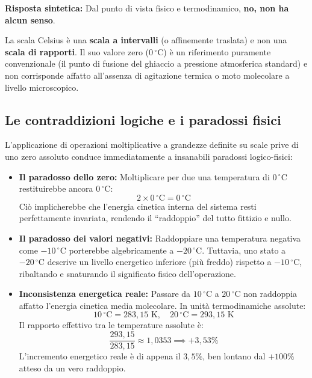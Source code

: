 \documentclass[11pt,a4paper,oneside]{report}
\begin{document}
\begin{approfondimento}
\textbf{Risposta sintetica:} Dal punto di vista fisico e termodinamico, \textbf{no, non ha alcun senso}.

La scala Celsius \`e una \textbf{scala a intervalli} (o affinemente traslata) e non una \textbf{scala di rapporti}. Il suo valore zero ($0\,{^\circ}\text{C}$) \`e un riferimento puramente convenzionale (il punto di fusione del ghiaccio a pressione atmosferica standard) e non corrisponde affatto all'assenza di agitazione termica o moto molecolare a livello microscopico.

\subsection*{Le contraddizioni logiche e i paradossi fisici}
L'applicazione di operazioni moltiplicative a grandezze definite su scale prive di uno zero assoluto conduce immediatamente a insanabili paradossi logico-fisici:
\begin{itemize}[leftmargin=*, nosep]
  \item \textbf{Il paradosso dello zero:} Moltiplicare per due una temperatura di $0\,{^\circ}\text{C}$ restituirebbe ancora $0\,{^\circ}\text{C}$:
  \[
  2 \times 0\,{^\circ}\text{C} = 0\,{^\circ}\text{C}
  \]
  Ci\`o implicherebbe che l'energia cinetica interna del sistema resti perfettamente invariata, rendendo il ``raddoppio'' del tutto fittizio e nullo.
  \item \textbf{Il paradosso dei valori negativi:} Raddoppiare una temperatura negativa come $-10\,{^\circ}\text{C}$ porterebbe algebricamente a $-20\,{^\circ}\text{C}$. Tuttavia, uno stato a $-20\,{^\circ}\text{C}$ descrive un livello energetico inferiore (pi\`u freddo) rispetto a $-10\,{^\circ}\text{C}$, ribaltando e snaturando il significato fisico dell'operazione.
  \item \textbf{Inconsistenza energetica reale:} Passare da $10\,{^\circ}\text{C}$ a $20\,{^\circ}\text{C}$ non raddoppia affatto l'energia cinetica media molecolare. In unit\`a termodinamiche assolute:
  \[
  10\,{^\circ}\text{C} = 283{,}15\text{ K}, \quad 20\,{^\circ}\text{C} = 293{,}15\text{ K}
  \]
  Il rapporto effettivo tra le temperature assolute \`e:
  \[
  \frac{293{,}15}{283{,}15} \approx 1{,}0353 \implies +3{,}53\%
  \]
  L'incremento energetico reale \`e di appena il $3{,}5\%$, ben lontano dal $+100\%$ atteso da un vero raddoppio.
\end{itemize}


\end{approfondimento}
\end{document}

